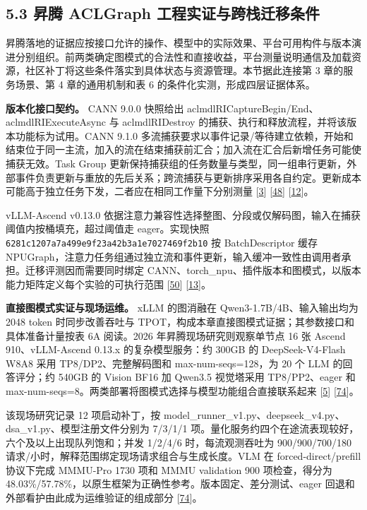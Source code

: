 \documentclass[UTF8,10.5pt,fontset=windows]{ctexart}
\begin{document}
\hypertarget{section-5-3}{%
\subsection{5.3 昇腾 ACLGraph
工程实证与跨栈迁移条件}\label{section-5-3}}

昇腾落地的证据应按接口允许的操作、模型中的实际效果、平台可用构件与版本演进分别组织。前两类确定图模式的合法性和直接收益，平台测量说明通信及加载资源，社区补丁将这些条件落实到具体状态与资源管理。本节据此连接第
3 章的服务场景、第 4 章的通用机制和表 6 的条件化实测，形成四层证据体系。

\textbf{版本化接口契约。} CANN 9.0.0 快照给出
aclmdlRICaptureBegin/End、aclmdlRIExecuteAsync 与 aclmdlRIDestroy
的捕获、执行和释放流程，并将该版本功能标为试用。CANN 9.1.0
多流捕获要求以事件记录/等待建立依赖，开始和结束位于同一主流，加入的流在结束捕获前汇合；加入流在汇合后新增任务可能使捕获无效。Task
Group
更新保持捕获组的任务数量与类型，同一组串行更新，外部事件负责更新与重放的先后关系；跨流捕获与更新排序采用各自约定。更新成本可能高于独立任务下发，二者应在相同工作量下分别测量
{[}\protect\hyperlink{ref-cann900overview}{3}{]}
{[}\protect\hyperlink{ref-cann910multi}{48}{]}
{[}\protect\hyperlink{ref-cann910update}{12}{]}。

vLLM-Ascend v0.13.0
依据注意力兼容性选择整图、分段或仅解码图，输入在捕获阈值内按桶填充，超过阈值走
eager。实现快照 \nolinkurl{6281c1207a7a499e9f23a42b3a1e7027469f2b10} 按
BatchDescriptor 缓存
NPUGraph，注意力任务组通过独立流和事件更新，输入缓冲一致性由调用者承担。迁移评测因而需要同时绑定
CANN、torch\_npu、插件版本和图模式，以版本能力矩阵定义每个实验的可执行范围
{[}\protect\hyperlink{ref-vllmascend0130}{50}{]}
{[}\protect\hyperlink{ref-vllmascend0130impl}{13}{]}。

\textbf{直接图模式实证与现场运维。} xLLM 的图消融在
Qwen3-1.7B/4B、输入输出均为 2048 token 时同步改善吞吐与
TPOT，构成本章直接图模式证据；其参数接口和具体准备计量按表 6A 阅读。2026
年昇腾现场研究则观察单节点 16 张 Ascend 910、vLLM-Ascend 0.13.x
的复杂模型服务：约 300GB 的 DeepSeek-V4-Flash W8A8 采用
TP8/DP2、完整解码图和 max-num-seqs=128，为 20 个 LLM 的回答评分；约
540GB 的 Vision BF16 加 Qwen3.5 视觉塔采用 TP8/PP2、eager 和
max-num-seqs=8。两类部署将图模式选择与模型功能组合直接联系起来
{[}\protect\hyperlink{ref-liu2025xllm}{5}{]}
{[}\protect\hyperlink{ref-yu2026ascendfield}{74}{]}。

该现场研究记录 12 项启动补丁，按
model\_runner\_v1.py、deepseek\_v4.py、dsa\_v1.py、模型注册文件分别为
7/3/1/1 项。量化服务约四个在途流表现较好，六个及以上出现队列饱和；并发
1/2/4/6 时，每流观测吞吐为 900/900/700/180
请求/小时，解释范围绑定现场请求组合与生成长度。VLM 在
forced-direct/prefill 协议下完成 MMMU-Pro 1730 项和 MMMU validation 900
项检查，得分为
48.03\%/57.78\%，以原生框架为正确性参考。版本固定、差分测试、eager
回退和外部看护由此成为运维验证的组成部分
{[}\protect\hyperlink{ref-yu2026ascendfield}{74}{]}。
\end{document}
